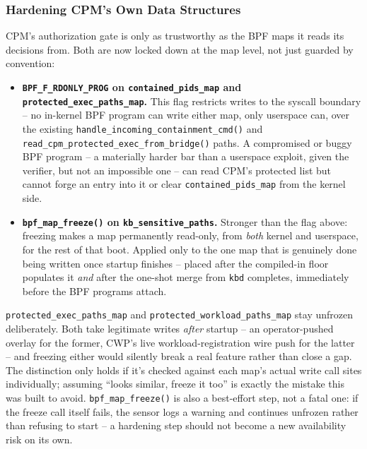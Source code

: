 \documentclass[11pt,a4paper]{article}
\begin{document}
\subsubsection{Hardening CPM's Own Data Structures}
\label{sec:bpf-map-hardening}

CPM's authorization gate is only as trustworthy as the BPF maps it
reads its decisions from. Both are now locked down at the map level,
not just guarded by convention:

\begin{itemize}
  \item \textbf{\texttt{BPF\_F\_RDONLY\_PROG} on
    \texttt{contained\_pids\_map} and
    \texttt{protected\_exec\_paths\_map}.} This flag restricts writes
    to the syscall boundary -- no in-kernel BPF program can write
    either map, only userspace can, over the existing
    \texttt{handle\_incoming\_containment\_cmd()} and
    \texttt{read\_cpm\_protected\_exec\_from\_bridge()} paths. A
    compromised or buggy BPF program -- a materially harder bar than
    a userspace exploit, given the verifier, but not an impossible one
    -- can read CPM's protected list but cannot forge an entry into
    it or clear \texttt{contained\_pids\_map} from the kernel side.
  \item \textbf{\texttt{bpf\_map\_freeze()} on
    \texttt{kb\_sensitive\_paths}.} Stronger than the flag above:
    freezing makes a map permanently read-only, from \emph{both}
    kernel and userspace, for the rest of that boot. Applied only to
    the one map that is genuinely done being written once startup
    finishes -- placed after the compiled-in floor populates it
    \emph{and} after the one-shot merge from \texttt{kbd} completes,
    immediately before the BPF programs attach.
\end{itemize}

\begin{notebox}
\texttt{protected\_exec\_paths\_map} and
\texttt{protected\_workload\_paths\_map} stay unfrozen deliberately.
Both take legitimate writes \emph{after} startup -- an operator-pushed
overlay for the former, CWP's live workload-registration wire push for
the latter -- and freezing either would silently break a real feature
rather than close a gap. The distinction only holds if it's checked
against each map's actual write call sites individually; assuming
``looks similar, freeze it too'' is exactly the mistake this was built
to avoid. \texttt{bpf\_map\_freeze()} is also a best-effort step, not a
fatal one: if the freeze call itself fails, the sensor logs a warning
and continues unfrozen rather than refusing to start -- a hardening
step should not become a new availability risk on its own.
\end{notebox}
\end{document}
